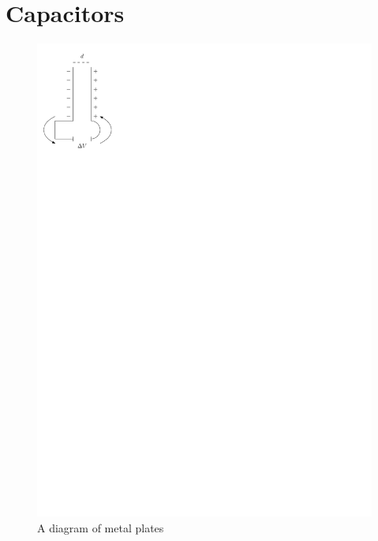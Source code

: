 \documentclass{article}
\begin{document}
  \section{Capacitors}
    \begin{figure}[H]
      \centering
      \includegraphics{figures/metal-plates.pdf}
      \caption{A diagram of metal plates}
    \end{figure}
\end{document}
